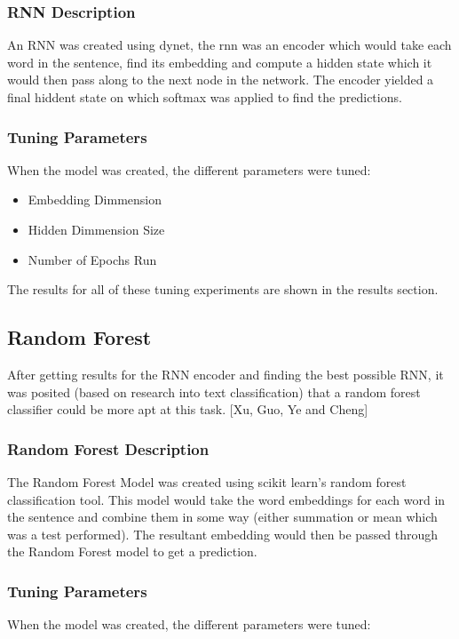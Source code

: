 \documentclass[twoside,twocolumn]{article}
\begin{document}
\subsubsection{RNN Description}

An RNN was created using dynet, the rnn was an encoder which would take each word in the
sentence, find its embedding and compute a hidden state which it would then pass along to the
next node in the network. The encoder yielded a final hiddent state on which softmax was applied
to find the predictions. 

\subsubsection{Tuning Parameters}

When the model was created, the different parameters were tuned:
\begin{itemize}
  \item{Embedding Dimmension}
  \item{Hidden Dimmension Size}
  \item{Number of Epochs Run}
\end{itemize}

The results for all of these tuning experiments are shown in the results section.


\subsection{Random Forest}

After getting results for the RNN encoder and finding the best possible RNN,
it was posited (based on research into text classification) that a random
forest classifier could be more apt at this task. [Xu, Guo, Ye and Cheng]

\subsubsection{Random Forest Description}

The Random Forest Model was created using scikit learn's random forest classification tool.
This model would take the word embeddings for each word in the sentence and combine them in some way
(either summation or mean which was a test performed). The resultant embedding would then be 
passed through the Random Forest model to get a prediction.

\subsubsection{Tuning Parameters}
When the model was created, the different parameters were tuned:
\end{document}
